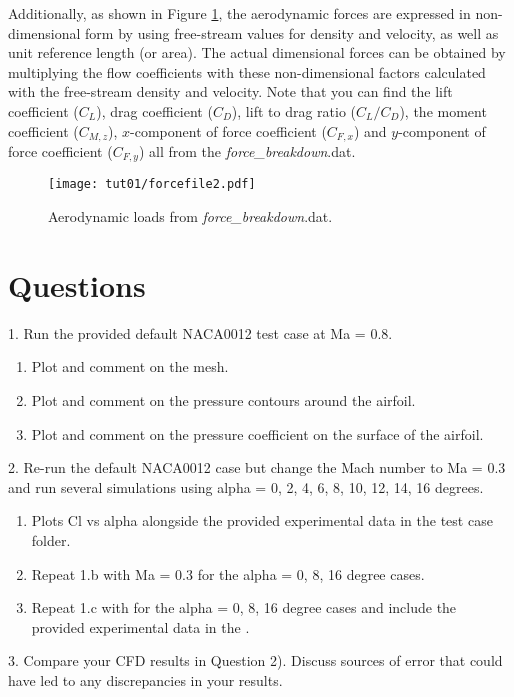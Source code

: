 Additionally, as shown in Figure \ref{fig1:forcefile2}, the aerodynamic forces are expressed in non-dimensional form by using free-stream values for density and velocity, as well as unit reference length (or area). The actual dimensional forces can be obtained by multiplying the flow coefficients with these non-dimensional factors calculated with the free-stream density and velocity. Note that you can find the lift coefficient ($C_L$), drag coefficient ($C_D$), lift to drag ratio ($C_L / C_D$), the moment coefficient ($C_{M,z}$), $x$-component of force coefficient ($C_{F,x}$) and $y$-component of force coefficient ($C_{F,y}$) all from the \textit{force\_breakdown}.dat.
\begin{figure}[htbp]
    \centering
    \texttt{[image: tut01/forcefile2.pdf]}
    \caption{Aerodynamic loads from \textit{force\_breakdown}.dat.}
    \label{fig1:forcefile2}
\end{figure}
\clearpage
\section{Questions}
1. Run the provided default NACA0012 test case at Ma = 0.8.
\begin{enumerate}[label=(\alph*)]
    \item Plot and comment on the mesh.
    \item Plot and comment on the pressure contours around the airfoil.
    \item Plot and comment on the pressure coefficient on the surface of the airfoil.
\end{enumerate}
2. Re-run the default NACA0012 case but change the Mach number to Ma = 0.3 and run several simulations using alpha = 0, 2, 4, 6, 8, 10, 12, 14, 16 degrees.
\begin{enumerate}[label=(\alph*)]
    \item Plots Cl vs alpha alongside the provided experimental data \cite{ladson1988effects} in the test case folder.
    \item Repeat 1.b with Ma = 0.3 for the alpha = 0, 8, 16 degree cases.
    \item Repeat 1.c with for the alpha = 0, 8, 16 degree cases and include the provided experimental data  in the \cite{ladson1987pressure}.
\end{enumerate}
3. Compare your CFD results in Question 2). Discuss sources of error that could have led to any discrepancies in your results.
